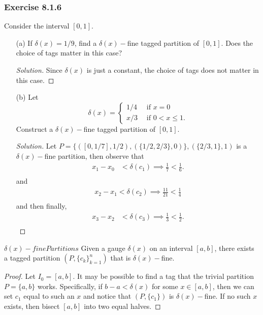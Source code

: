 \subsubsection{Exercise 8.1.6} Consider the interval \( [0,1]  \). 
\begin{enumerate}
    \item[(a)] If \( \delta(x) = 1/ 9 \), find a \( \delta(x)-\)fine tagged partition of \( [0,1]  \). Does the choice of tags matter in this case? 
        \begin{proof}[Solution]
        Since \( \delta(x) \) is just a constant, the choice of tags does not matter in this case.
        \end{proof}
    \item[(b)] Let 
        \[ \delta(x) = 
        \begin{cases}
            1/4 \ &\text{ if } x = 0 \\
            x/3  &\text{ if  } 0  < x \leq 1.
        \end{cases}  \]
        Construct a \( \delta(x)- \)fine tagged partition of \( [0,1] \).  
    \begin{proof}[Solution]
        Let \( P = \{ ([0, 1/7], 1/2), (\{ 1/2, 2/3 \}, 0 ) \}, (\{ 2/3, 1 \}, 1) \) is a \( \delta(x)- \)fine partition, then observe that 
        \begin{align*}
            x_{1} - x_{0} &< \delta(c_{1}) \implies \frac{ 1 }{ 7 } < \frac{ 1 }{ 6 }. \\
        \end{align*}
        and 
        \begin{align*}
            x_{2} - x_{1} < \delta(c_{2}) \implies \frac{ 11 }{ 21 } < \frac{ 1 }{ 4 } \\
        \end{align*}
        and then finally, 
        \begin{align*}
            x_{3} - x_{2} &< \delta(c_{3}) \implies \frac{ 1 }{ 3 } < \frac{ 1 }{ 2 }. \\
        \end{align*}

    \end{proof}
\end{enumerate}

\begin{theorem}{\( \delta(x)-fine Partitions \)}{}
    Given a gauge \( \delta(x)  \) on an interval \( [a,b]  \), there exists a tagged partition \( (P, \{ c_{k }  \}_{k=1}^{n}) \) that is \( \delta(x)- \)fine.
\end{theorem}
\begin{proof}
    Let \( I_{0} = [a,b]  \). It may be possible to find a tag that the trivial partition \( P = \{ a,b  \}  \) works. Specifically, if \( b-a < \delta(x)  \) for some \( x \in [a,b]  \), then we can set \( c_{1} \) equal to such an \( x  \) and notice that \( (P, \{ c_{1} \} ) \) is \( \delta(x)-\)fine. If no such \( x  \) exists, then bisect \( [a,b] \) into two equal halves.
\end{proof}


